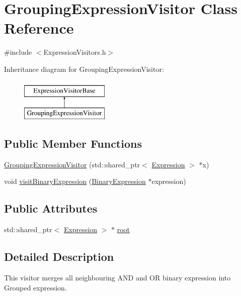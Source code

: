\hypertarget{class_grouping_expression_visitor}{\section{Grouping\+Expression\+Visitor Class Reference}
\label{class_grouping_expression_visitor}
}


{\ttfamily \#include $<$Expression\+Visitors.\+h$>$}

Inheritance diagram for Grouping\+Expression\+Visitor\+:\begin{figure}[H]
\begin{center}
\leavevmode
\includegraphics[height=2.000000cm]{class_grouping_expression_visitor}
\end{center}
\end{figure}
\subsection*{Public Member Functions}
\begin{DoxyCompactItemize}
\item 
\hyperlink{class_grouping_expression_visitor_a237e5aaa25294095a1b3c14c4ef64794}{Grouping\+Expression\+Visitor} (std\+::shared\+\_\+ptr$<$ \hyperlink{class_expression}{Expression} $>$ $\ast$x)
\item 
void \hyperlink{class_grouping_expression_visitor_aba30832e7f966be15e50b17d68badbb1}{visit\+Binary\+Expression} (\hyperlink{class_binary_expression}{Binary\+Expression} $\ast$expression)
\end{DoxyCompactItemize}
\subsection*{Public Attributes}
\begin{DoxyCompactItemize}
\item 
std\+::shared\+\_\+ptr$<$ \hyperlink{class_expression}{Expression} $>$ $\ast$ \hyperlink{class_grouping_expression_visitor_a493ef343ca18357dca158d83085b5ab4}{root}
\end{DoxyCompactItemize}


\subsection{Detailed Description}
This visitor merges all neighbouring A\+N\+D and O\+R binary expression into Grouped expression. 

